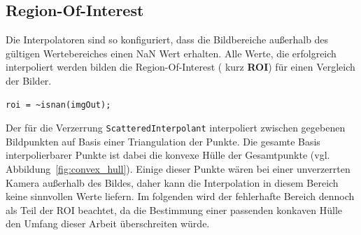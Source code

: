 \subsection{Region-Of-Interest}
\label{sec:roi}
Die Interpolatoren sind so konfiguriert, dass die Bildbereiche außerhalb des gültigen Wertebereiches einen NaN Wert erhalten. Alle Werte, die erfolgreich interpoliert werden bilden die Region-Of-Interest ( kurz \textbf{ROI}) für einen Vergleich der Bilder.
\begin{lstlisting}[style=Matlab-editor,basicstyle=\mlttfamily]
%% Bestimmung der Region of Interest für Entzerrung
roi = ~isnan(imgOut);
\end{lstlisting}
Der für die Verzerrung \texttt{ScatteredInterpolant} interpoliert zwischen gegebenen Bildpunkten auf Basis einer Triangulation der Punkte. Die gesamte Basis interpolierbarer Punkte ist dabei die konvexe Hülle der Gesamtpunkte (vgl. Abbildung~\ref{fig:convex_hull}). Einige dieser Punkte wären bei einer unverzerrten Kamera außerhalb des Bildes, daher kann die Interpolation in diesem Bereich keine sinnvollen Werte liefern. Im folgenden wird der fehlerhafte Bereich dennoch als Teil der ROI beachtet, da die Bestimmung einer passenden konkaven Hülle den Umfang dieser Arbeit überschreiten würde.
